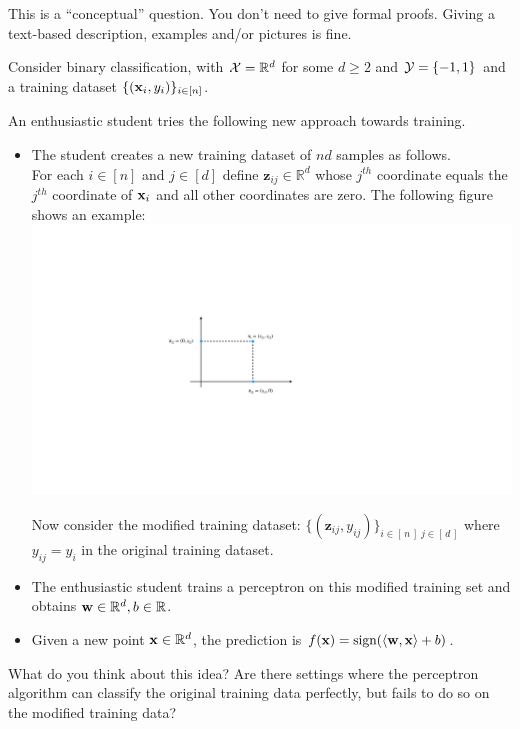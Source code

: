 This is a ``conceptual'' question. You don't need to give formal proofs. Giving a text-based description, examples and/or pictures is fine.

\vspace{5mm}
Consider binary classification, with ${\cal{X}} = \mathbb{R}^d$ for some $d \geq 2$ and ${\cal Y} = \{-1,1\}$ and a  training dataset $\{(\mathbf{x}_i,y_i)\}_{i \in [n]}$.


An enthusiastic student tries the following new approach towards training.
\begin{itemize}
    \item The student creates a new training dataset of $nd$ samples as follows.\\
    For each $i \in [n]$ and $j \in [d]$ define $\mathbf{z}_{ij} \in \mathbb{R}^{d}$ whose $j^{th}$ coordinate equals the $j^{th}$ coordinate of $\mathbf{x}_i$ and all other coordinates are zero. The following figure shows an example:\\
    \includegraphics[width=0.5\linewidth]{midterm/images/enthusiastic.pdf}
    
     Now consider the modified training dataset:  $\{(\mathbf{z}_{ij},y_{ij})\}_{i\in [\,n\,]\; j\in [\,d\,]}$ where $y_{ij}=y_i$ in the original training dataset.

    \item The enthusiastic student trains a perceptron on this modified training set and obtains $\mathbf{w} \in \mathbb{R}^d, b \in \mathbb{R}$.
    \item Given a new point $\mathbf{x} \in \mathbb{R}^d$, the prediction is $f(\mathbf{x}) = \text{sign} (\langle \mathbf{w}, \mathbf{x} \rangle + b)$.
\end{itemize}

\vspace{10mm}

What do you think about this idea? Are there settings where the perceptron algorithm can classify the original training data perfectly, but fails to do so on the modified training data? 

